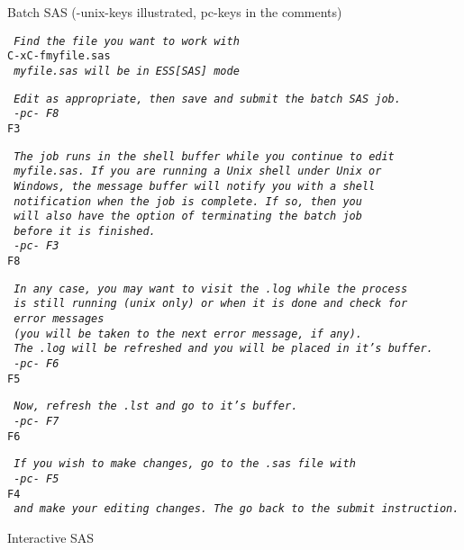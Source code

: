 \documentclass{article}
\newcommand*{\Scmt}[1]{\hbox{\qquad {\footnotesize \#\#} \textsl{#1}}}
\newenvironment{Salltt}{\small\begin{alltt}}{\end{alltt}}
\begin{document}
Batch SAS (-unix-keys illustrated, pc-keys in the comments)
\begin{Salltt}
    \Scmt{Find the file you want to work with}
    C-x C-f myfile.sas
    \Scmt{myfile.sas will be in ESS[SAS] mode}

    \Scmt{Edit as appropriate, then save and submit the batch SAS job.}
    \Scmt{-pc- F8}
    F3

    \Scmt{The job runs in the shell buffer while you continue to edit }
    \Scmt{myfile.sas.  If you are running a Unix shell under Unix or}
    \Scmt{Windows, the message buffer will notify you with a shell}
    \Scmt{notification when the job is complete.  If so, then you }
    \Scmt{will also have the option of terminating the batch job}
    \Scmt{before it is finished.}
    \Scmt{-pc- F3}
    F8

    \Scmt{In any case, you may want to visit the .log while the process}
    \Scmt{is still running (unix only) or when it is done and check for}
    \Scmt{error messages }
    \Scmt{(you will be taken to the next error message, if any).}
    \Scmt{The .log will be refreshed and you will be placed in it's buffer.}
    \Scmt{-pc- F6}
    F5

    \Scmt{Now, refresh the .lst and go to it's buffer.}
    \Scmt{-pc- F7}
    F6

    \Scmt{If you wish to make changes, go to the .sas file with}
    \Scmt{-pc- F5}
    F4
    \Scmt{and make your editing changes.  The go back to the submit instruction.}
\end{Salltt}

Interactive SAS
\end{document}
